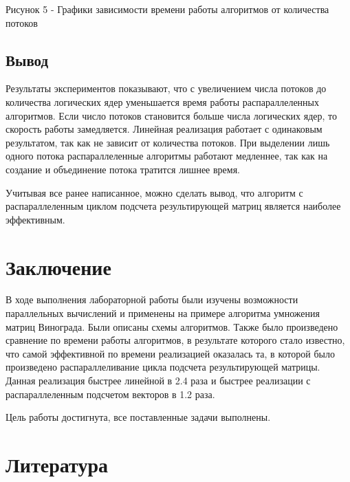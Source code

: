 \documentclass[14pt, a4paper]{extarticle}
\begin{document}
	\begin{center}
		Рисунок 5 -  Графики зависимости времени работы алгоритмов от количества потоков	
	\end{center}
	 
	 
	 \subsection*{Вывод}
	 Результаты экспериментов показывают, что с увеличением числа потоков до количества логических ядер уменьшается время работы распараллеленных алгоритмов. Если число потоков становится больше числа логических ядер, то скорость работы замедляется. Линейная реализация работает с одинаковым результатом, так как не зависит от количества потоков. При выделении лишь одного потока распараллеленные алгоритмы работают медленнее, так как на создание и объединение потока тратится лишнее время. \par
	 Учитывая все ранее написанное, можно сделать вывод, что алгоритм с распараллеленным циклом подсчета результирующей матриц является наиболее эффективным. 
	
	
	\clearpage
	\section*{Заключение}
	В ходе выполнения лабораторной работы были изучены возможности параллельных вычислений и применены на примере алгоритма умножения матриц Винограда. Были описаны схемы алгоритмов. Также было произведено сравнение по времени работы алгоритмов, в результате которого стало известно, что самой эффективной по времени реализацией оказалась та, в которой было произведено распараллеливание цикла подсчета результирующей матрицы. Данная реализация быстрее линейной в 2.4 раза и быстрее реализации с распараллеленным подсчетом векторов в 1.2 раза.
	
	Цель работы достигнута, все поставленные задачи выполнены.
	
	
	\newpage	
	\section*{Литература}
		
\end{document}
